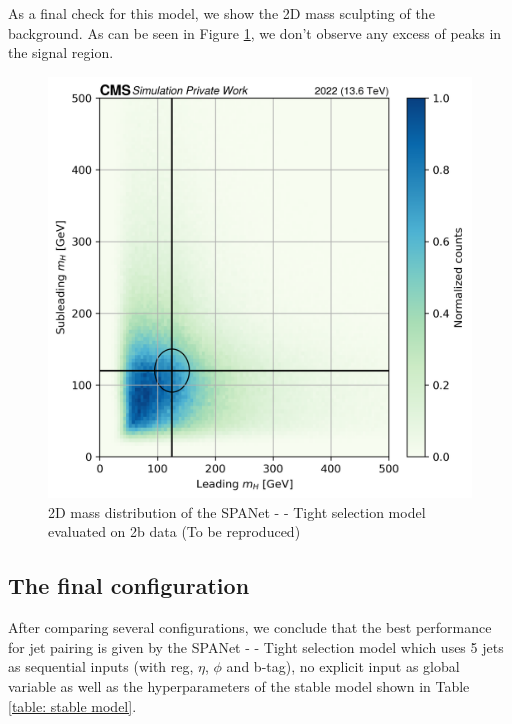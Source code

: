 As a final check for this model, we show the 2D mass sculpting of the background. As can be seen in Figure \ref{fig: 2D mass dist kl}, we don't observe any excess of peaks in the signal region.

\begin{figure}
    \centering
    \includegraphics[width=0.6\linewidth]{Images/6.Improving/kappa lambda/mass dist best model.png}
    \caption{2D mass distribution of the  SPANet - \kl - Tight selection model evaluated on 2b data (To be reproduced)}
    \label{fig: 2D mass dist kl}
\end{figure}

\clearpage

\subsection{The final configuration}
After comparing several configurations, we conclude that the best performance for jet pairing is given by the SPANet - \kl - Tight selection model which uses 5 jets as sequential inputs (with \pt reg, $\eta$, $\phi$ and b-tag), no explicit \kl input as global variable as well as the hyperparameters of the stable model shown in Table \ref{table: stable model}.

